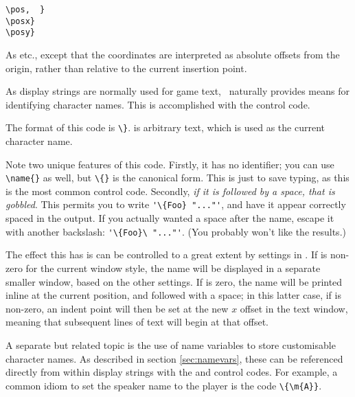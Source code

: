     \lstinline|\pos|\rawlbrace{}\lstinline|, |~\lstinline|}|\\
    \lstinline|\posx|\rawlbrace{}\lstinline|}|\\
    \lstinline|\posy|\rawlbrace{}\lstinline|}|
    \begin{cmdesc}
      As  etc., except that the coordinates are interpreted as 
      absolute offsets from the origin, rather than relative to the current 
      insertion point.      
    \end{cmdesc}

  \label{sec:nameblocks}
    As display strings are normally used for game text, \reallive\ naturally
    provides means for identifying character names.  This is accomplished
    with the  control code.

    The format of this code is
    \lstinline|\|\rawlbrace{}\lstinline|}|.   is
    arbitrary text, which is used as the current character name.

    Note two unique features of this code.  Firstly, it has no identifier; you
    can use \lstinline|\name{}| as well, but \lstinline|\{}| is the canonical
    form.  This is just to save typing, as this is the most common control code.
    Secondly, \emph{if it is followed by a space, that is gobbled}.  This
    permits you to write \lstinline|'\{Foo} "..."'|, and have it appear correctly
    spaced in the output.  If you actually wanted a space after the name, escape
    it with another backslash: \lstinline|'\{Foo}\ "..."'|.  (You probably won't
    like the results.)

    The effect this has is can be controlled to a great extent by settings in
    \gameexe.  If  is non-zero for
    the current window style, the name will be displayed in a separate smaller
    window, based on the other  settings.  If
     is zero, the name will be
    printed inline at the current position, and followed with a space; in this
    latter case, if  is non-zero,
    an indent point will then be set at the new $x$ offset in the text window,
    meaning that subsequent lines of text will begin at that offset.

    A separate but related topic is the use of name variables to store
    customisable character names.  As described in section \ref{sec:namevars},
    these can be referenced directly from within display strings with the
     and  control codes.  For example, a common idiom to set
    the speaker name to the player is the code \lstinline|\{\m{A}}|.

